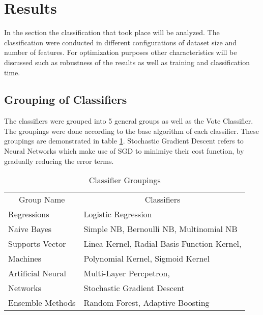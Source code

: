 \section{Results}
	In the section the classification that took place will be analyzed. The classification were conducted in different configurations of  dataset size and number of features. For optimization purposes other characteristics will be discussed such as robustness of the results as well as training and classification time.
	
	\subsection{Grouping of Classifiers}
		The classifiers were grouped into 5 general groups as well as the Vote Classifier. The groupings were done according to the base algorithm of each classifier. These groupings are demonstrated in table \ref{table:class_grps}. Stochastic Gradient Descent refers to Neural Networks which make use of SGD to minimiye their cost function, by gradually reducing the error terms.
		
		\begin{table}[h]	
			\begin{center}
				\begin{tabular}{l | l} 
					\hline
					\hline
					\multicolumn{1}{c|}{\multirow{2}{*}{Group Name}} & \multicolumn{1}{|c}{\multirow{2}{*}{Classifiers}}\\ 
					 &   \\ 
					\hline\hline
					Regressions 	  & Logistic Regression  \\
					\hline
					Naive Bayes       & Simple NB, Bernoulli NB, Multinomial NB \\
					\hline
					\vspace*{-1mm} 
					Supports Vector   & Linea Kernel, Radial Basis Function Kernel,\\
					Machines		  & Polynomial Kernel, Sigmoid Kernel \\
					\hline
					\vspace*{-1mm} 
					Artificial Neural & Multi-Layer Percpetron,  \\
					Networks		  & Stochastic Gradient Descent \\
					\hline
					Ensemble Methods  & Random Forest, Adaptive Boosting \\
					\hline
					\hline
				\end{tabular}
			\end{center}
			\caption[Classifier Groupings]{Classifier Groupings}
			\label{table:class_grps}
		\end{table}
	
